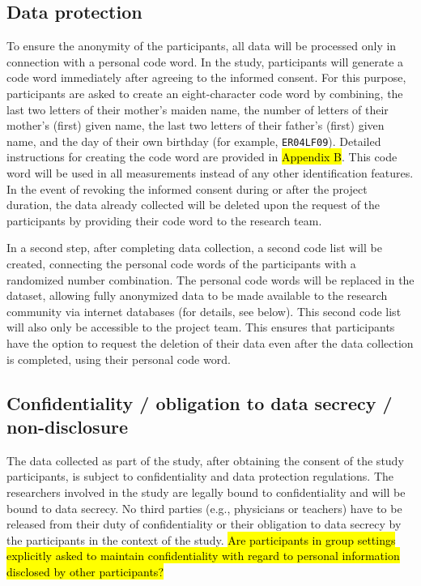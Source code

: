 \documentclass[11pt,twoside,a4paper]{article}
\begin{document}
\subsection{Data protection}
\label{sec:data_protection}

To ensure the anonymity of the participants, all data will be processed only in connection with a personal code word.
In the study, participants will generate a code word immediately after agreeing to the informed consent.
For this purpose, participants are asked to create an eight-character code word by combining, the last two letters of their mother's maiden name, the number of letters of their mother's (first) given name, the last two letters of their father's (first) given name, and the day of their own birthday (for example, \texttt{ER04LF09}).
Detailed instructions for creating the code word are provided in \hl{Appendix B}.
This code word will be used in all measurements instead of any other identification features.
In the event of revoking the informed consent during or after the project duration, the data already collected will be deleted upon the request of the participants by providing their code word to the research team.

In a second step, after completing data collection, a second code list will be created, connecting the personal code words of the participants with a randomized number combination.
The personal code words will be replaced in the dataset, allowing fully anonymized data to be made available to the research community via internet databases (for details, see below).
This second code list will also only be accessible to the project team.
This ensures that participants have the option to request the deletion of their data even after the data collection is completed, using their personal code word.

\subsection{Confidentiality / obligation to data secrecy / non-disclosure}

The data collected as part of the study, after obtaining the consent of the study participants, is subject to confidentiality and data protection regulations.
The researchers involved in the study are legally bound to confidentiality and will be bound to data secrecy.
No third parties (e.g., physicians or teachers) have to be released from their duty of confidentiality or their obligation to data secrecy by the participants in the context of the study.
\hl{Are participants in group settings explicitly asked to maintain confidentiality with regard to personal information disclosed by other participants?}
\end{document}
